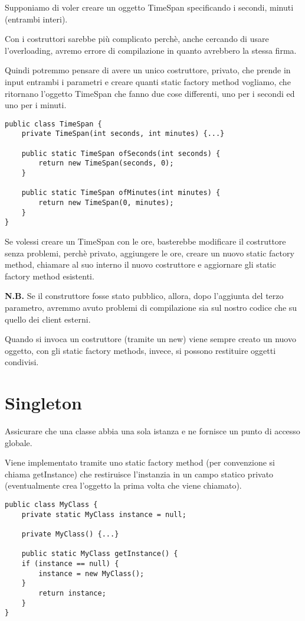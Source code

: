 Supponiamo di voler creare un oggetto TimeSpan specificando i secondi, minuti (entrambi interi).

Con i costruttori sarebbe più complicato perchè, anche cercando di usare l'overloading, avremo errore di compilazione in quanto avrebbero la stessa firma.

Quindi potremmo pensare di avere un unico costruttore, privato, che prende in input entrambi i parametri e creare quanti static factory method vogliamo, che ritornano
l'oggetto TimeSpan che fanno due cose differenti, uno per i secondi ed uno per i minuti.

\begin{lstlisting}
public class TimeSpan {
    private TimeSpan(int seconds, int minutes) {...}

    public static TimeSpan ofSeconds(int seconds) {
        return new TimeSpan(seconds, 0);
    }

    public static TimeSpan ofMinutes(int minutes) {
        return new TimeSpan(0, minutes);
    }
}
\end{lstlisting}

Se volessi creare un TimeSpan con le ore, basterebbe modificare il costruttore senza problemi, perchè privato, aggiungere le ore, creare un nuovo static factory method, 
chiamare al suo interno il nuovo costruttore e aggiornare gli static factory method esistenti.

\medskip
\textbf{N.B.} Se il construttore fosse stato pubblico, allora, dopo l'aggiunta del terzo parametro, avremmo avuto problemi di compilazione sia sul nostro codice che su 
quello dei client esterni.
\medskip

Quando si invoca un costruttore (tramite un new) viene sempre creato un nuovo oggetto, con gli static factory methods, invece, si possono restituire oggetti condivisi.

\section{Singleton}

Assicurare che una classe abbia una sola istanza e ne fornisce un punto di accesso globale.

Viene implementato tramite uno static factory method (per convenzione si chiama getInstance) che restiruisce l'instanzia in un campo statico privato 
(eventualmente crea l'oggetto la prima volta che viene chiamato).

\begin{lstlisting}
public class MyClass {
    private static MyClass instance = null;
    
    private MyClass() {...}

    public static MyClass getInstance() {
    if (instance == null) {
        instance = new MyClass();
    }
        return instance;
    }
}
\end{lstlisting}

